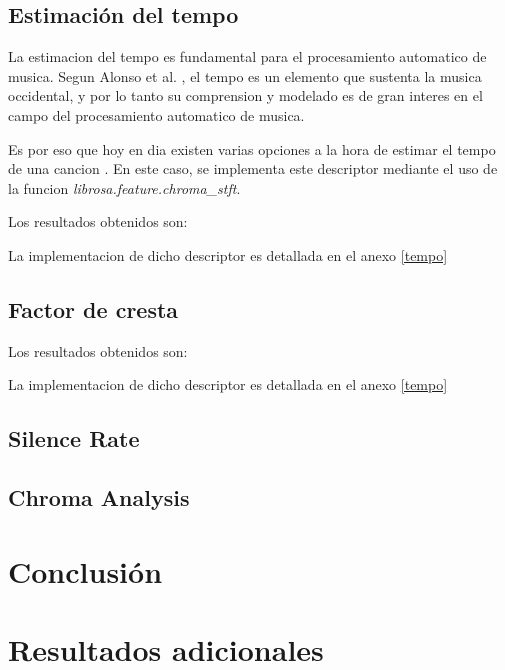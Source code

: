 \documentclass[]{article}
\begin{document}
\begin{multicols}{2}
\subsection{Estimación del tempo}
\label{sec: tempo}

La estimacion del tempo es fundamental para el procesamiento automatico de musica.
Segun Alonso et al. \cite{alonso2004tempo}, el tempo es un elemento que sustenta
la musica occidental, y por lo tanto su comprension y modelado es de gran interes
en el campo del procesamiento automatico de musica.

Es por eso que hoy en dia existen varias opciones a la hora de estimar el tempo
de una cancion \cite{goto1997issues}. En este caso, se implementa este descriptor
mediante el uso de la funcion \emph{{librosa.feature.chroma\_stft}}.

Los resultados obtenidos son:

La implementacion de dicho descriptor es detallada en el anexo \ref{tempo}

\subsection{Factor de cresta}
Los resultados obtenidos son:

La implementacion de dicho descriptor es detallada en el anexo \ref{tempo}

\subsection{Silence Rate}

\subsection{Chroma Analysis}




\section{Conclusión}
\printbibliography
\end{multicols}

\newpage

\appendix
\section{Resultados adicionales}
\end{document}
